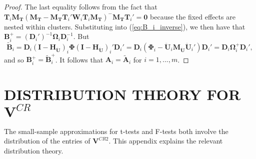 \documentclass[12pt]{article}\usepackage[]{graphicx}\usepackage[]{color}
\newcommand{\bm}{\mathbf}
\newcommand{\bs}{\boldsymbol}
\begin{document}
\begin{proof}
The last equality follows from the fact that $\bm{T}_i \bm{M_T}\left(\bm{M_T} - \bm{M_T}\bm{T}_i' \bm{W}_i \bm{T}_i\bm{M_T}\right)^{-} \bm{M_T} \bm{T}_i' = \bm{0}$ because the fixed effects are nested within clusters. 
Substituting into (\ref{eq:B_i_inverse}), we then have that $\bm{B}_i^+ = \left(\bm{D}_i'\right)^{-1} \bs\Omega_i \bm{D}_i^{-1}$. 
But \[
\bm{\tilde{B}}_i = \bm{D}_i \left(\bm{I} - \bm{H_{\ddot{U}}}\right)_i \bs\Phi \left(\bm{I} - \bm{H_{\ddot{U}}}\right)_i' \bm{D}_i' = \bm{D}_i \left(\bs\Phi_i - \bm{\ddot{U}}_i\bm{M_{\ddot{U}}} \bm{\ddot{U}}_i'\right) \bm{D}_i' = \bm{D}_i \bs\Omega_i^+ \bm{D}_i',
\]
and so $\bm{B}_i^+ = \bm{\tilde{B}}_i^+$. It follows that $\bm{A}_i = \bm{\tilde{A}}_i$ for $i = 1,...,m$. 
\end{proof}

\section{DISTRIBUTION THEORY FOR $\bm{V}^{CR}$}
\label{app:VCR_dist}

The small-sample approximations for t-tests and F-tests both involve the distribution of the entries of $\bm{V}^{CR2}$. This appendix explains the relevant distribution theory.

\end{document}
